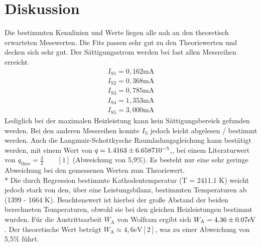 \section{Diskussion}
\label{Diskussion}
Die bestimmten Kennlinien und Werte liegen alle nah an den theoretisch erwarteten Messwerten.
Die Fits passen sehr gut zu den Theoriewerten und decken sich sehr gut. 
Der Sättigungsstrom werden bei fast allen Messreihen erreicht.
\begin{gather*}
	I_\text{S1} = 0,162 \text{mA} \\
	I_\text{S2} = 0,368 \text{mA} \\
	I_\text{S3} = 0,785 \text{mA} \\
	I_\text{S4} = 1,353 \text{mA} \\
	I_\text{S5} = 3,000 \text{mA}
\end{gather*}
Lediglich bei der maximalen Heizleistung kann kein Sättigungsbereich gefunden werden. Bei den anderen Messreihen konnte $I_\text{S}$ jedoch leicht abgelesen / bestimmt werden. \*
Auch die Langmuir-Schottkysche Raumladungsgleichung kann bestätigt werden, mit einem Wert von $q = \num{1.4163 \pm 6.6587}{10^{-5}}$,, bei einem Literaturwert von $q_{\text{theo}} = \frac{3}{2} \qquad [1]$ (Abweichung von 5,9\%).
Es besteht nur eine sehr geringe Abweichung bei den gemessenen Werten zum Theoriewert. \\*
Die durch Regression bestimmte Kathodentemperatur (T = 2411.1 K) weicht jedoch stark von den, über eine Leistungsbilanz, bestimmten Temperaturen ab (1399 - 1664 K). Beachtenswert ist hierbei der große Abstand der beiden berechneten Temperaturen, obwohl sie bei den gleichen Heizleistungen bestimmt wurden.\*
Für die Austrittsarbeit $W_\text{A}$ von Wolfram ergibt sich $W_\text{A} = \num{4.36 \pm 0.07} \text{eV}$. Der theoretische Wert beträgt $W_\text{A} \approx 4,6 \text{eV}  [2]$, was zu einer Abweichung von 5,5\% führt.